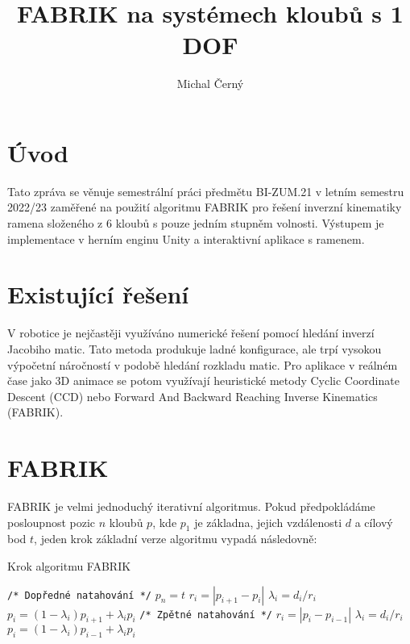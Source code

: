 \documentclass[czech]{pyt-report}
\title{FABRIK na systémech kloubů s 1 DOF}
\author{Michal Černý}
\affiliation{FIT ČVUT}
\begin{document}
\maketitle

\section{Úvod}
\label{sec:uvod}
Tato zpráva se věnuje semestrální práci předmětu BI-ZUM.21 v letním semestru 2022/23 zaměřené na použití algoritmu FABRIK\cite{bib:fabrik} pro řešení inverzní kinematiky ramena složeného z 6 kloubů s pouze jedním stupněm volnosti. Výstupem je implementace v herním enginu Unity\cite{bib:unity} a interaktivní aplikace s ramenem.

\section{Existující řešení}
\label{sec:exitujici_reseni}
V robotice je nejčastěji využíváno numerické řešení pomocí hledání inverzí Jacobiho matic. Tato metoda produkuje ladné konfigurace, ale trpí vysokou výpočetní náročností v podobě hledání rozkladu matic. Pro aplikace v reálném čase jako 3D animace se potom využívají heuristické metody Cyclic Coordinate Descent (CCD) nebo Forward And Backward Reaching Inverse Kinematics\cite{bib:fabrik} (FABRIK).

\section{FABRIK}
\label{sec:fabrik}
FABRIK je velmi jednoduchý iterativní algoritmus\cite{bib:fabrik}. Pokud předpokládáme posloupnost pozic $n$ kloubů $p$, kde $p_1$ je základna, jejich vzdálenosti $d$ a cílový bod $t$, jeden krok základní verze algoritmu vypadá následovně:

\begin{algorithm}[H]
\caption{Krok algoritmu FABRIK}\label{alg:fabrik}
\begin{algorithmic}[1]
\Statex \texttt{/* Dopředné natahování */}
\State $p_n = t$
    \State $r_i = \left|p_{i + 1} - p_i\right|$
    \State $\lambda_i = d_i / r_i$
    \State $p_i = (1 - \lambda_i) p_{i + 1} + \lambda_i p_i$
\EndFor
\Statex
\Statex \texttt{/* Zpětné natahování */}
    \State $r_i = \left|p_i - p_{i - 1}\right|$
    \State $\lambda_i = d_i / r_i$
    \State $p_i = (1 - \lambda_i) p_{i - 1} + \lambda_i p_i$
\EndFor
\end{algorithmic}
\end{algorithm}
\end{document}
